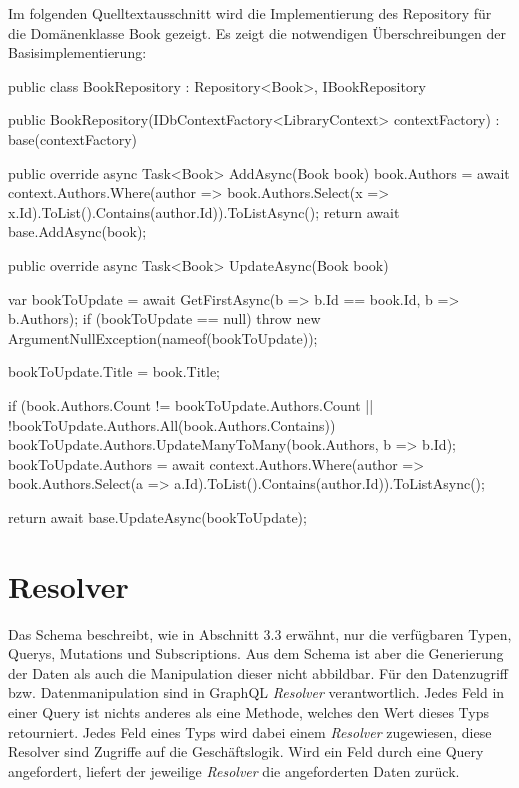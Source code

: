 Im folgenden Quelltextausschnitt wird die Implementierung des Repository für die Domänenklasse Book gezeigt.
Es zeigt die notwendigen Überschreibungen der Basisimplementierung:

\begin{JsCode}
public class BookRepository : Repository<Book>, IBookRepository {
    public BookRepository(IDbContextFactory<LibraryContext> contextFactory) : base(contextFactory) { }

    public override async Task<Book> AddAsync(Book book) {
        book.Authors = await context.Authors.Where(author => book.Authors.Select(x => x.Id).ToList().Contains(author.Id)).ToListAsync();
        return await base.AddAsync(book);
    }

    public override async Task<Book> UpdateAsync(Book book) {
        var bookToUpdate = await GetFirstAsync(b => b.Id == book.Id, b => b.Authors);
        if (bookToUpdate == null) {
            throw new ArgumentNullException(nameof(bookToUpdate));
        }

        bookToUpdate.Title = book.Title;

        if (book.Authors.Count != bookToUpdate.Authors.Count || !bookToUpdate.Authors.All(book.Authors.Contains)) {
            bookToUpdate.Authors.UpdateManyToMany(book.Authors, b => b.Id);
            bookToUpdate.Authors = await context.Authors.Where(author => book.Authors.Select(a => a.Id).ToList().Contains(author.Id)).ToListAsync();
        }

        return await base.UpdateAsync(bookToUpdate);
    }
}
\end{JsCode}

\section{Resolver}
Das Schema beschreibt, wie in Abschnitt 3.3 erwähnt, nur die verfügbaren Typen, Querys, Mutations und Subscriptions.
Aus dem Schema ist aber die Generierung der Daten als auch die Manipulation dieser nicht abbildbar.
Für den Datenzugriff bzw. Datenmanipulation sind in GraphQL \textit{Resolver} verantwortlich.
Jedes Feld in einer Query ist nichts anderes als eine Methode, welches den Wert dieses Typs retourniert.
Jedes Feld eines Typs wird dabei einem \textit{Resolver} zugewiesen, diese Resolver sind Zugriffe auf die Geschäftslogik.
Wird ein Feld durch eine Query angefordert, liefert der jeweilige \textit{Resolver} die angeforderten Daten zurück.

